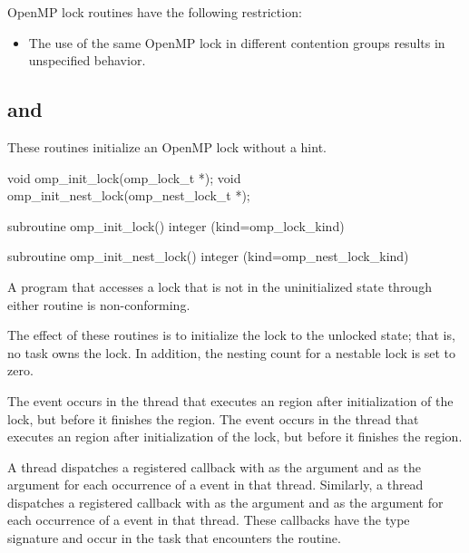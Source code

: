 \restrictions
OpenMP lock routines have the following restriction:

\begin{itemize}
\item The use of the same OpenMP lock in different contention groups 
      results in unspecified behavior.
\end{itemize}



\subsection{ and }
\label{subsec:omp_init_lock and omp_init_nest_lock}
\summary
These routines initialize an OpenMP lock without a hint.

\format
\begin{ccppspecific}
\begin{ompcFunction}
void omp_init_lock(omp_lock_t *);
void omp_init_nest_lock(omp_nest_lock_t *);
\end{ompcFunction}
\end{ccppspecific}

\begin{fortranspecific}
\begin{ompfSubroutine}
subroutine omp_init_lock()
integer (kind=omp_lock_kind) 

subroutine omp_init_nest_lock()
integer (kind=omp_nest_lock_kind) 
\end{ompfSubroutine}
\end{fortranspecific}

\constraints
A program that accesses a lock that is not in the uninitialized state 
through either routine is non-conforming.

\effect
The effect of these routines is to initialize the lock to the unlocked 
state; that is, no task owns the lock. In addition, the nesting count 
for a nestable lock is set to zero.

\events
The  event occurs in the thread that executes an 
 region after initialization of the lock, but 
before it finishes the region. The  event occurs 
in the thread that executes an  region
after initialization of the lock, but before it finishes the region.

\tools
A thread dispatches a registered  
callback with  as the  argument 
and  as the  argument for each 
occurrence of a  event in that thread. Similarly, 
a thread dispatches a registered  
callback with  as the  argument 
and  as the  argument for each 
occurrence of a  event in that thread. These 
callbacks have the type signature 
and occur in the task that encounters the routine.

